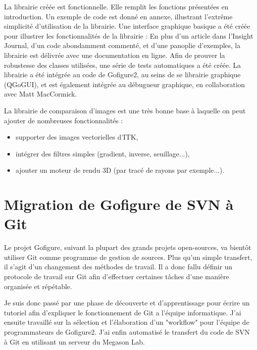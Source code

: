 La librairie créée est fonctionnelle. Elle remplit les fonctions présentées en introduction. Un exemple de code est donné en annexe, illustrant l'extrême simplicité d'utilisation de la librairie.
Une interface graphique basique a été créée pour illustrer les fonctionnalités de la librairie :
En plus d'un article dans l'Insight Journal, d'un code abondamment commenté, et d'une panoplie d'exemples,
la librairie est délivrée avec une documentation en ligne.
Afin de prouver la robustesse des classes utilisées, une série de tests automatiques a été créée.
La librairie a été intégrée au code de Gofigure2, au seins de se librairie graphique (QGoGUI), et est également intégrée au débugueur graphique, en collaboration avec Matt MacCormick.

La librairie de comparaison d'images est une très bonne base à laquelle on peut ajouter de nombreuses fonctionnalités :
\begin{itemize}
  \item supporter des images vectorielles d'ITK,
  \item intégrer des filtres simples (gradient, inverse, seuillage...),
  \item ajouter un moteur de rendu 3D (par tracé de rayons par exemple...).
\end{itemize}








\section{Migration de Gofigure de SVN à Git}

Le projet Gofigure, suivant la plupart des grands projets open-sources, va bientôt utiliser Git comme programme de gestion de sources.
Plus qu'un simple transfert, il s'agit d'un changement des méthodes de travail.
Il a donc fallu définir un protocole de travail sur Git 
afin d'effectuer certaines tâches d'une manière organisée et répétable. 

Je suis donc passé par une phase de découverte et d'apprentissage pour écrire un tutoriel 
afin d'expliquer le fonctionnement de Git a l'équipe informatique. J'ai ensuite travaillé sur la sélection et l'élaboration d'un "workflow"
pour l'équipe de programmateurs de Gofigure2.
J'ai enfin automatisé le transfert du code de SVN à Git en utilisant un serveur du Megason Lab.



